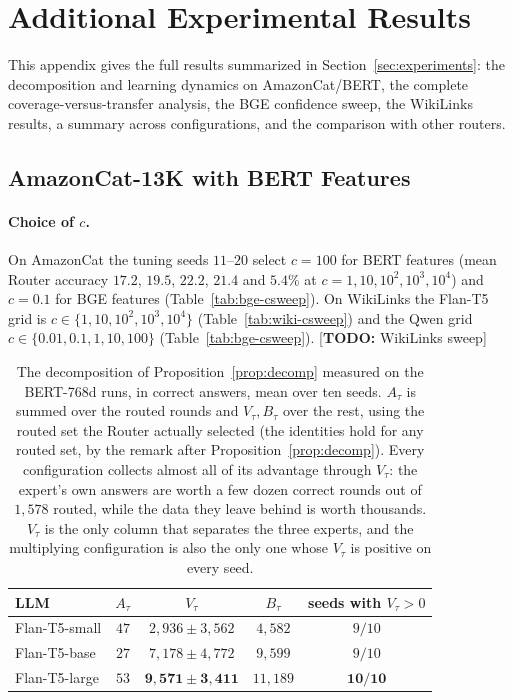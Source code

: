 \documentclass{article}
\theoremstyle{definition}
\theoremstyle{remark}
\theoremstyle{remark}
\newcommand{\todo}[1]{\textcolor{red!70!black}{[\textbf{TODO:} #1]}}
\begin{document}
\section{Additional Experimental Results}
\label{app:more-exp}

This appendix gives the full results summarized in Section~\ref{sec:experiments}:
the decomposition and learning dynamics on AmazonCat/BERT, the complete
coverage-versus-transfer analysis, the BGE confidence sweep, the WikiLinks
results, a summary across configurations, and the comparison with other
routers.

\subsection{AmazonCat-13K with BERT Features}
\label{app:amazon-bert}

\paragraph{Choice of $c$.} On AmazonCat the tuning seeds $11$--$20$ select
$c=100$ for BERT features (mean Router accuracy $17.2$, $19.5$, $22.2$, $21.4$
and $5.4\%$ at $c=1,10,10^2,10^3,10^4$) and $c=0.1$ for BGE features
(Table~\ref{tab:bge-csweep}). On WikiLinks the Flan-T5 grid is
$c\in\{1,10,10^2,10^3,10^4\}$ (Table~\ref{tab:wiki-csweep}) and the Qwen grid
$c\in\{0.01,0.1,1,10,100\}$ (Table~\ref{tab:bge-csweep}).
\todo{WikiLinks sweep}

\begin{table}[h]
\centering
\caption{The decomposition of Proposition~\ref{prop:decomp} measured on the
BERT-768d runs, in correct answers, mean over ten seeds. $A_\tau$ is summed
over the routed rounds and $V_\tau,B_\tau$ over the rest, using the routed set
the Router actually selected (the identities hold for any routed set, by the
remark after Proposition~\ref{prop:decomp}). Every configuration collects
almost all of its advantage through $V_\tau$: the expert's own answers are
worth a few dozen correct rounds out of $1{,}578$ routed, while the data they
leave behind is worth thousands. $V_\tau$ is the only column that separates
the three experts, and the multiplying configuration is also the only one whose
$V_\tau$ is positive on every seed.}
\label{tab:amazon-decomp}
\small
\begin{tabular}{@{}lcccc@{}}
\toprule
LLM & $A_\tau$ & $V_\tau$ & $B_\tau$ & seeds with $V_\tau>0$ \\
\midrule
Flan-T5-small  & $47$ & $2{,}936\pm3{,}562$ & $4{,}582$ & $9/10$ \\
Flan-T5-base   & $27$ & $7{,}178\pm4{,}772$ & $9{,}599$ & $9/10$ \\
Flan-T5-large  & $53$ & $\mathbf{9{,}571\pm3{,}411}$ & $11{,}189$ & $\mathbf{10/10}$ \\
\bottomrule
\end{tabular}
\end{table}
\end{document}
